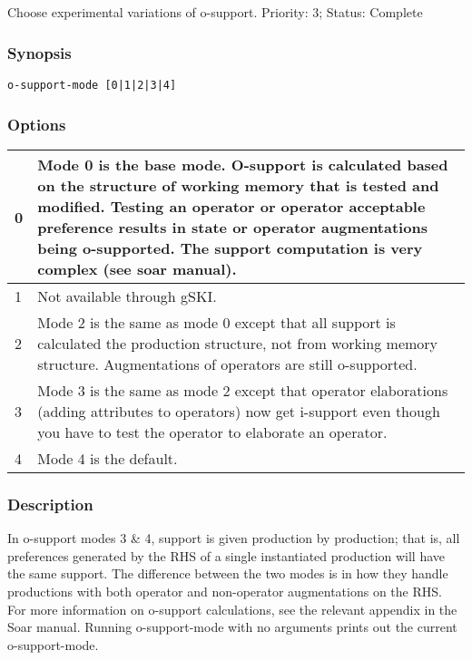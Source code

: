\subsection{}
\label{o-support-mode}
Choose experimental variations of o-support. 
 Priority: 3; Status: Complete
\subsubsection*{Synopsis}
\begin{verbatim}
o-support-mode [0|1|2|3|4]
\end{verbatim}
\subsubsection*{Options}
\begin{tabular}{|l|l|}
\hline 
 0  & Mode 0 is the base mode. O-support is calculated based on the structure of working memory that is tested and modified. Testing an operator or operator acceptable preference results in state or operator augmentations being o-supported. The support computation is very complex (see soar manual).  \\
 \hline 
 1  & Not available through gSKI.  \\
 \hline 
 2  & Mode 2 is the same as mode 0 except that all support is calculated the production structure, not from working memory structure. Augmentations of operators are still o-supported.  \\
 \hline 
 3  & Mode 3 is the same as mode 2 except that operator elaborations (adding attributes to operators) now get i-support even though you have to test the operator to elaborate an operator.  \\
 \hline 
 4  & Mode 4 is the default.  \\
 \hline 
\end{tabular}
\subsubsection*{Description}
 In o-support modes 3 \& 4, support is given production by production; that is, all preferences generated by the RHS of a single instantiated production will have the same support. The difference between the two modes is in how they handle productions with both operator and non-operator augmentations on the RHS. For more information on o-support calculations, see the relevant appendix in the Soar manual. 
 Running o-support-mode with no arguments prints out the current o-support-mode. 
